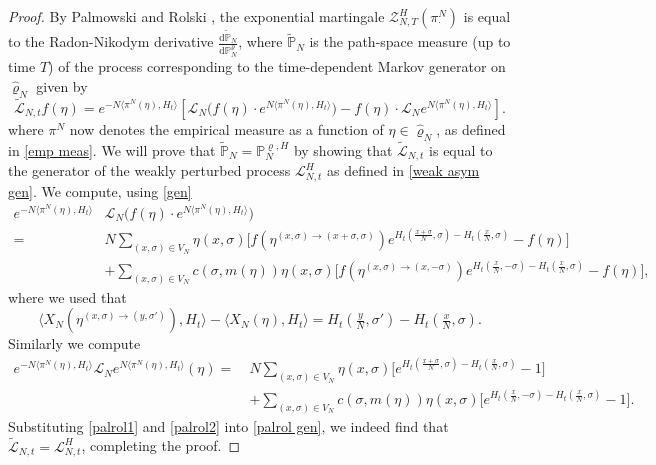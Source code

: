 \documentclass[11pt]{article}
\numberwithin{equation}{section}
\theoremstyle{definition}
\theoremstyle{plain}
\newcommand{\p}{\mathbb{P}}
\newcommand{\dd}{\mathrm{d}}
\newcommand{\nn}{\nonumber}
\begin{document}
\begin{proof}
By Palmowski and Rolski \cite{palmowski}, the exponential martingale $\mathcal Z^H_{N,T}(\pi^N_{\cdot})$ is equal to the Radon-Nikodym derivative $\frac{\dd\widetilde{\p}_N}{\dd\p^{\varrho}_N}$, where $\widetilde{\p}_N$ is the path-space measure  (up to time $T$) of the process corresponding to the time-dependent Markov generator on $\widehat{\varrho}_N$ given by 
    \begin{equation}\label{palrol gen}
        \widetilde{\mathscr{L}}_{N,t}f(\eta) = e^{-N\langle \pi^N(\eta), H_t\rangle} \left[ \mathscr{L}_N\big( f(\eta)\cdot e^{N\langle \pi^N(\eta), H_t\rangle}\big) - f(\eta)\cdot \mathscr{L}_N e^{N\langle \pi^N(\eta), H_t\rangle}\right].
    \end{equation}
where $\pi^N$ now denotes the empirical measure as a function of $\eta \in \widehat{\varrho}_N$, as defined in \eqref{emp meas}. We will prove that $\widetilde{\p}_N = \p_{N}^{\varrho,H}$ by showing that $\widetilde{\mathscr{L}}_{N,t}$ is equal to the generator of the weakly perturbed process $\mathscr{L}_{N,t}^H$ as defined in \eqref{weak asym gen}. We compute, using \eqref{gen}
    \begin{align}\label{palrol1}
        e^{-N\langle \pi^N(\eta), H_t\rangle}&\mathscr{L}_N\big( f(\eta)\cdot e^{N\langle \pi^N(\eta), H_t\rangle}\big)\nonumber\\
        \nn=\ & N\sum_{(x,\sigma)\in V_N} \eta(x,\sigma)\big[f(\eta^{(x,\sigma)\to (x+\sigma,\sigma)})e^{H_t(\frac{x+\sigma}{N},\sigma) - H_t(\frac{x}{N},\sigma)}  - f(\eta)\big]\\
        &   + \sum_{(x,\sigma)\in V_N} c(\sigma,m(\eta)) \eta(x,\sigma)\big[f(\eta^{(x,\sigma)\to(x,-\sigma)})e^{H_t(\frac{x}{N},-\sigma) - H_t(\frac{x}{N},\sigma)}-f(\eta)\big],
    \end{align}
where we used that 
    \begin{equation}
        \langle X_N(\eta^{(x,\sigma)\to(y,\sigma')}), H_t\rangle - \langle X_N(\eta),H_t\rangle = H_t(\tfrac{y}{N},\sigma') - H_t(\tfrac{x}{N},\sigma).
    \end{equation}      
Similarly we compute
    \begin{align}\label{palrol2}
        e^{-N\langle \pi^N(\eta), H_t\rangle}\mathscr{L}_Ne^{N\langle \pi^N(\eta), H_t\rangle}(\eta)
        \nn=\ & N\sum_{(x,\sigma)\in V_N} \eta(x,\sigma)\big[e^{H_t(\frac{x+\sigma}{N},\sigma) - H_t(\frac{x}{N},\sigma)}  -1\big]\\
        &  + \sum_{(x,\sigma)\in V_N} c(\sigma,m(\eta)) \eta(x,\sigma)\big[e^{H_t(\frac{x}{N},-\sigma) - H_t(\frac{x}{N},\sigma)}-1\big].
    \end{align}
Substituting \eqref{palrol1} and \eqref{palrol2}  into \eqref{palrol gen}, we indeed find that $\widetilde{\mathscr{L}}_{N,t}=\mathscr{L}_{N,t}^H$, completing the proof. 
\end{proof}
\end{document}

